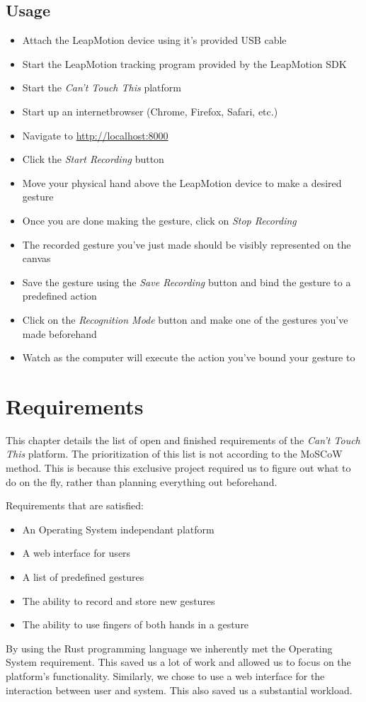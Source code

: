 \documentclass[a4paper]{article}
\providecommand{\tightlist}{%
\setlength{\itemsep}{0pt}\setlength{\parskip}{0pt}}
\begin{document}
  \subsection{Usage}
  \begin{itemize}
    \tightlist
    \item Attach the LeapMotion device using it's provided USB cable
    \item Start the LeapMotion tracking program provided by the LeapMotion SDK
    \item Start the \textit{Can't Touch This} platform
    \item Start up an internetbrowser (Chrome, Firefox, Safari, etc.)
    \item Navigate to \url{http://localhost:8000}
    \item Click the \textit{Start Recording} button
    \item Move your physical hand above the LeapMotion device to make a desired
      gesture
    \item Once you are done making the gesture, click on \textit{Stop Recording}
    \item The recorded gesture you've just made should be visibly represented on
      the canvas
    \item Save the gesture using the \textit{Save Recording} button and bind the
      gesture to a predefined action
    \item Click on the \textit{Recognition Mode} button and make one of the
      gestures you've made beforehand
    \item Watch as the computer will execute the action you've bound your
      gesture to
  \end{itemize}
  \clearpage

  \section{Requirements}
  This chapter details the list of open and finished requirements of the
  \textit{Can't Touch This} platform. The prioritization of this list is not
  according to the MoSCoW method. This is because this exclusive project
  required us to figure out what to do on the fly, rather than planning
  everything out beforehand.

  Requirements that are satisfied: 
  \begin{itemize}
    \tightlist
    \item An Operating System independant platform
    \item A web interface for users
    \item A list of predefined gestures
    \item The ability to record and store new gestures
    \item The ability to use fingers of both hands in a gesture
  \end{itemize}
  By using the Rust programming language we inherently met the Operating System
  requirement. This saved us a lot of work and allowed us to focus on the
  platform's functionality. Similarly, we chose to use a web interface for the
  interaction between user and system. This also saved us a substantial
  workload.
\end{document}
